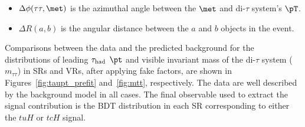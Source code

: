 \begin{itemize}
\item $\Delta\phi(\tau\tau,\met)$ is the azimuthal angle between the $\met$ and di-$\tau$ system's $\pT$.
\item $\Delta R(a,b)$ is the angular distance between the $a$ and $b$ objects in the event. 
\end{itemize}

Comparisons between the data and the predicted background for the distributions of leading $\tau_{\mathrm{had}}$ $\pt$  and visible invariant mass of the di-$\tau$ system ($m_{\tau\tau}$)
in SRs and VRs, after applying fake factors, 
are shown in Figures~\ref{fig:taupt_prefit} and~\ref{fig:mtt}, respectively.
The data are well described by the background model in all cases.
The final observable used to extract the signal contribution is the BDT distribution in each SR corresponding to either the $tuH$ or $tcH$ signal.

